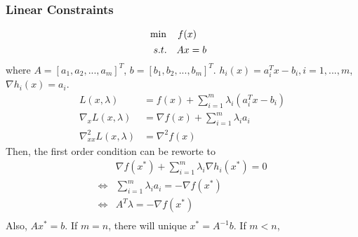 \documentclass[11pt,a4paper]{article}
\begin{document}
\subsubsection{Linear Constraints}
\begin{align*}
    &\min\quad f(x)\\
    &\begin{array}{r@{\quad}r@{}l@{\quad}l}
    s.t.
    &Ax=b&\\
\end{array}
\end{align*}
where $A=\left[a_1,a_2,...,a_m\right]^T$, $b=[b_1,b_2,...,b_m]^T$. $h_i(x)=a_i^Tx-b_i,i=1,...,m$, $\nabla h_i(x)=a_i$.
\begin{equation}
    \begin{aligned}
        L(x,\lambda)&=f(x)+\sum_{i=1}^m\lambda_i(a_i^Tx-b_i)\\
        \nabla_x L(x,\lambda)&=\nabla f(x)+\sum_{i=1}^m\lambda_ia_i\\
        \nabla^2_{xx} L(x,\lambda)&=\nabla^2 f(x)
    \end{aligned}
    \nonumber
\end{equation}
Then, the first order condition can be reworte to
\begin{equation}
    \begin{aligned}
        &\nabla f(x^*)+\sum_{i=1}^m\lambda_i \nabla h_i(x^*)=0\\
        \Leftrightarrow	&\sum_{i=1}^m\lambda_i a_i=-\nabla f(x^*)\\
        \Leftrightarrow	&A^T\lambda=-\nabla f(x^*)\\
    \end{aligned}
    \nonumber
\end{equation}
Also, $Ax^*=b$. If $m=n$, there will unique $x^*=A^{-1}b$. If $m<n$,
\begin{center}
\end{center}
\end{document}
